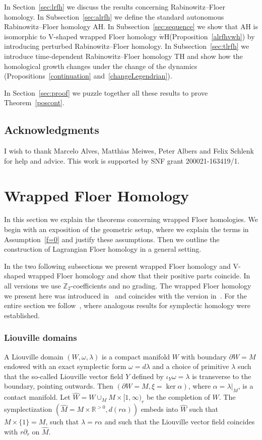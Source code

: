 \documentclass{amsart}
\newcommand{\RR}{\mathbb{R}}
\newcommand{\ZZ}{\mathbb{Z}}
\newcommand{\WcheckH}{\operatorname{\check wH}}
\newcommand{\haat}{\widehat}
\theoremstyle{definition}
\theoremstyle{remark}
\numberwithin{equation}{section}
\begin{document}
	In Section~\ref{sec:lrfh} we discuss the results concerning Rabinowitz--Floer homology. In Subsection~\ref{sec:alrfh} we define the standard autonomous Rabinowitz--Floer homology AH. In Subsection~\ref{sec:sequence} we show that AH is isomorphic to V-shaped wrapped Floer homology $\WcheckH$(Proposition~\ref{alrfhvwh}) by introducing perturbed Rabinowitz--Floer homology. In Subsection~\ref{sec:tlrfh} we introduce time-dependent Rabinowitz--Floer homology TH and show how the homological growth changes under the change of the dynamics (Propositions~\ref{continuation} and~\ref{changeLegendrian}).
	
	In Section~\ref{sec:proof} we puzzle together all these results to prove Theorem~\ref{poscont}.

\subsection*{Acknowledgments}
	I wish to thank Marcelo Alves, Matthias Meiwes, Peter Albers and Felix Schlenk for help and advice. This work is supported by SNF grant 200021-163419/1.


\section{Wrapped Floer Homology}\label{sec:wfh}

In this section we explain the theorems concerning wrapped Floer homologies. We begin with an exposition of the geometric setup, where we explain the terms in Assumption~\ref{f=0} and justify these assumptions. Then we outline the construction of Lagrangian Floer homology in a general setting. 

In the two following subsections we present wrapped Floer homology and V-shaped wrapped Floer homology and show that their positive parts coincide. In all versions we use $\ZZ_2$-coefficients and no grading. The wrapped Floer homology we present here was introduced in~\cite{AS10} and coincides with the version in~\cite{AM17}. For the entire section we follow~\cite{CFO10}, where analogous results for symplectic homology were established.

\subsubsection*{Liouville domains} A Liouville domain $(W,\omega,\lambda)$ is a compact manifold $W$ with boundary $\partial W=M$ endowed with an exact symplectic form $\omega=d\lambda$ and a choice of primitive $\lambda$ such that the so-called Liouville vector field $Y$ defined by $\iota_Y\omega=\lambda$ is transverse to the boundary, pointing outwards. Then $(\partial W=M,\xi=\ker\alpha)$, where $\alpha=\lambda|_M$, is a contact manifold. Let $\haat W=W\cup_M M\times[1,\infty)_r$ be the completion of $W$. The symplectization $(\haat M=M\times\RR^{>0},d(r\alpha))$ embeds into $\haat W$ such that $M\times\{1\}=M$, such that $\lambda=r\alpha$ and such that the Liouville vector field coincides with $r\partial_r$ on $\haat M$. 
\end{document}
